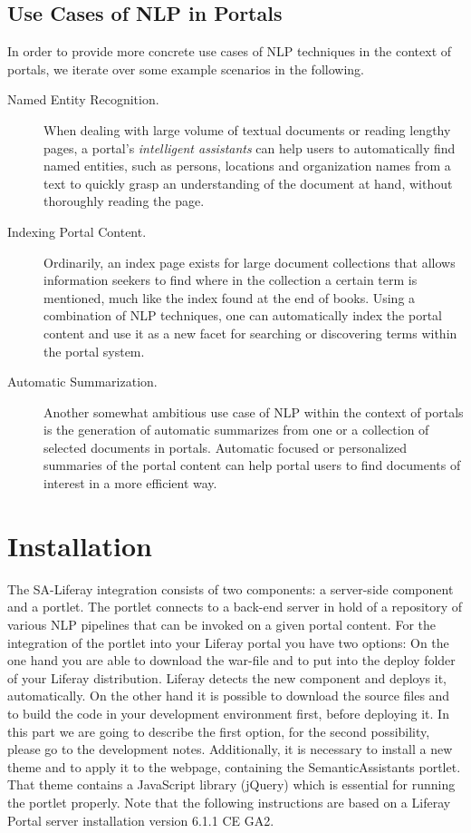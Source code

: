 \subsection{Use Cases of NLP in Portals}
In order to provide more concrete use cases of NLP techniques in the context of portals, we iterate over some example scenarios in the following.

\begin{description}
\item[Named Entity Recognition.] When dealing with large volume of textual documents or reading lengthy pages, a portal's \emph{intelligent assistants} can help users to automatically find named entities, such as persons, locations and organization names from a text to quickly grasp an understanding of the document at hand, without thoroughly reading the page. 
\item[Indexing Portal Content.] Ordinarily, an index page exists for large document collections that allows information seekers to find where in the collection a certain term is mentioned, much like the index found at the end of books. Using a combination of NLP techniques, one can automatically index the portal content and use it as a new facet for searching or discovering terms within the portal system.
\item[Automatic Summarization.] Another somewhat ambitious use case of NLP within the context of portals is the generation of automatic summarizes from one or a collection of selected documents in portals. Automatic focused or personalized summaries of the portal content can help portal users to find documents of interest in a more efficient way.
\end{description}

\noindent

\section{Installation}
The SA-Liferay integration consists of two components: a server-side component and a portlet. The portlet connects to a back-end \sa server in hold of a repository of various NLP pipelines that can be invoked on a given portal content. For the integration of the \sa portlet into your Liferay portal you have two options: On the one hand you are able to download the war-file and to put into the deploy folder of your Liferay distribution. Liferay detects the new component and deploys it, automatically. On the other hand it is possible to download the source files and to build the code in your development environment first, before deploying it. In this part we are going to describe the first option, for the second possibility, please go to the development notes. Additionally, it is necessary to install a new theme and to apply it to the webpage, containing the SemanticAssistants portlet. That theme contains a JavaScript library (jQuery) which is essential for running the \sa portlet properly. Note that the following instructions are based on a Liferay Portal server installation version 6.1.1 CE GA2. 

